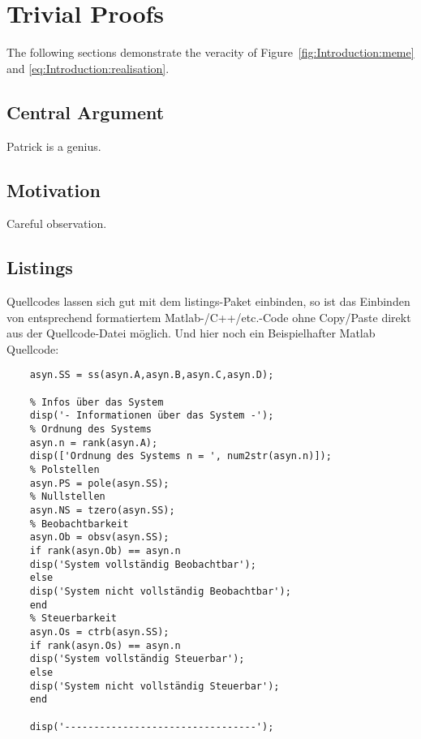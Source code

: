 \chapter{Trivial Proofs}

The following sections demonstrate the veracity of Figure~\ref{fig:Introduction:meme} and \eqref{eq:Introduction:realisation}.

\section{Central Argument}

Patrick is a genius.

\section{Motivation}

Careful observation.

\section{Listings}

Quellcodes lassen sich gut mit dem listings-Paket einbinden, so ist das Einbinden von entsprechend formatiertem Matlab-/C++/etc.-Code ohne Copy/Paste direkt aus der Quellcode-Datei möglich. Und hier noch ein Beispielhafter Matlab Quellcode:

\begin{lstlisting}[caption={Ein wahnsinnig komplizierter Quellcode}]
	%% State Space System
	asyn.SS = ss(asyn.A,asyn.B,asyn.C,asyn.D);
	
	% Infos über das System
	disp('- Informationen über das System -');
	% Ordnung des Systems
	asyn.n = rank(asyn.A);
	disp(['Ordnung des Systems n = ', num2str(asyn.n)]);
	% Polstellen
	asyn.PS = pole(asyn.SS);
	% Nullstellen
	asyn.NS = tzero(asyn.SS);
	% Beobachtbarkeit
	asyn.Ob = obsv(asyn.SS);
	if rank(asyn.Ob) == asyn.n
	disp('System vollständig Beobachtbar');
	else
	disp('System nicht vollständig Beobachtbar');
	end
	% Steuerbarkeit
	asyn.Os = ctrb(asyn.SS);
	if rank(asyn.Os) == asyn.n
	disp('System vollständig Steuerbar');
	else
	disp('System nicht vollständig Steuerbar');
	end
	
	disp('---------------------------------');
\end{lstlisting}